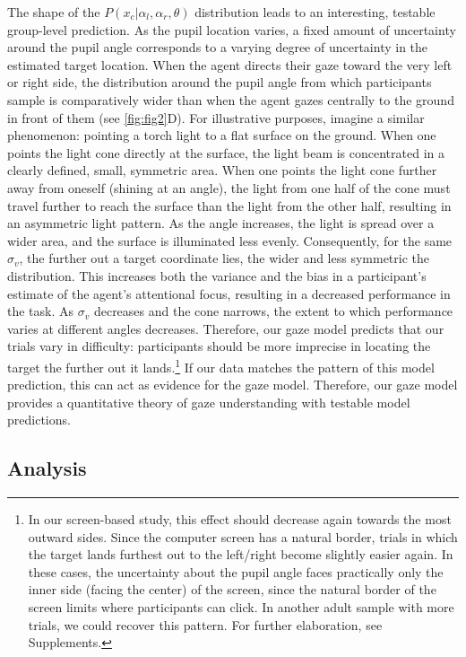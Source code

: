 \documentclass[
  man,mask,floatsintext]{apa6}
\begin{document}
The shape of the \(P(x_c | \alpha_l, \alpha_r, \theta)\) distribution leads to an interesting, testable group-level prediction. As the pupil location varies, a fixed amount of uncertainty around the pupil angle corresponds to a varying degree of uncertainty in the estimated target location. When the agent directs their gaze toward the very left or right side, the distribution around the pupil angle from which participants sample is comparatively wider than when the agent gazes centrally to the ground in front of them (see \ref{fig:fig2}D). For illustrative purposes, imagine a similar phenomenon: pointing a torch light to a flat surface on the ground. When one points the light cone directly at the surface, the light beam is concentrated in a clearly defined, small, symmetric area. When one points the light cone further away from oneself (shining at an angle), the light from one half of the cone must travel further to reach the surface than the light from the other half, resulting in an asymmetric light pattern. As the angle increases, the light is spread over a wider area, and the surface is illuminated less evenly. Consequently, for the same \(\sigma_v\), the further out a target coordinate lies, the wider and less symmetric the distribution. This increases both the variance and the bias in a participant's estimate of the agent's attentional focus, resulting in a decreased performance in the task. As \(\sigma_v\) decreases and the cone narrows, the extent to which performance varies at different angles decreases. Therefore, our gaze model predicts that our trials vary in difficulty: participants should be more imprecise in locating the target the further out it lands.\footnote{In our screen-based study, this effect should decrease again towards the most outward sides. Since the computer screen has a natural border, trials in which the target lands furthest out to the left/right become slightly easier again. In these cases, the uncertainty about the pupil angle faces practically only the inner side (facing the center) of the screen, since the natural border of the screen limits where participants can click. In another adult sample with more trials, we could recover this pattern. For further elaboration, see Supplements.} If our data matches the pattern of this model prediction, this can act as evidence for the gaze model. Therefore, our gaze model provides a quantitative theory of gaze understanding with testable model predictions.

\hypertarget{analysis-1}{%
\subsection{Analysis}\label{analysis-1}}
\end{document}
